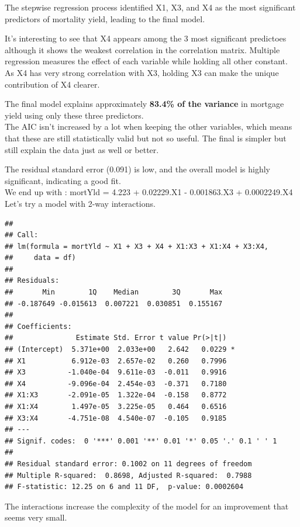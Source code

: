 \documentclass[
  11pt,
]{article}
\begin{document}
The stepwise regression process identified X1, X3, and X4 as the most
significant predictors of mortality yield, leading to the final model.

It's interesting to see that X4 appears among the 3 most significant
predictoes although it shows the weakest correlation in the correlation
matrix. Multiple regression measures the effect of each variable while
holding all other constant. As X4 has very strong correlation with X3,
holding X3 can make the unique contribution of X4 clearer.

The final model explains approximately \textbf{83.4\% of the variance}
in mortgage yield using only these three predictors.\\
The AIC isn't increased by a lot when keeping the other variables, which
means that these are still statistically valid but not so useful. The
final is simpler but still explain the data just as well or better.

The residual standard error (0.091) is low, and the overall model is
highly significant, indicating a good fit.\\
We end up with : mortYld = 4.223 + 0.02229.X1 - 0.001863.X3 +
0.0002249.X4\\

Let's try a model with 2-way interactions.

\begin{verbatim}
## 
## Call:
## lm(formula = mortYld ~ X1 + X3 + X4 + X1:X3 + X1:X4 + X3:X4, 
##     data = df)
## 
## Residuals:
##       Min        1Q    Median        3Q       Max 
## -0.187649 -0.015613  0.007221  0.030851  0.155167 
## 
## Coefficients:
##               Estimate Std. Error t value Pr(>|t|)  
## (Intercept)  5.371e+00  2.033e+00   2.642   0.0229 *
## X1           6.912e-03  2.657e-02   0.260   0.7996  
## X3          -1.040e-04  9.611e-03  -0.011   0.9916  
## X4          -9.096e-04  2.454e-03  -0.371   0.7180  
## X1:X3       -2.091e-05  1.322e-04  -0.158   0.8772  
## X1:X4        1.497e-05  3.225e-05   0.464   0.6516  
## X3:X4       -4.751e-08  4.540e-07  -0.105   0.9185  
## ---
## Signif. codes:  0 '***' 0.001 '**' 0.01 '*' 0.05 '.' 0.1 ' ' 1
## 
## Residual standard error: 0.1002 on 11 degrees of freedom
## Multiple R-squared:  0.8698, Adjusted R-squared:  0.7988 
## F-statistic: 12.25 on 6 and 11 DF,  p-value: 0.0002604
\end{verbatim}

The interactions increase the complexity of the model for an improvement
that seems very small.
\end{document}

